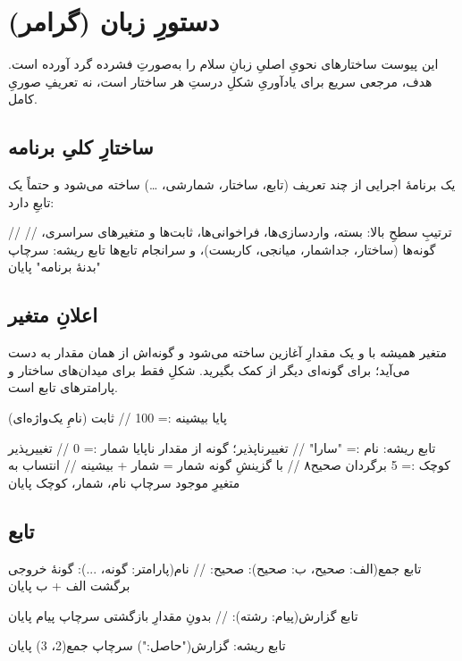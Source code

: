 \chapter{دستورِ زبان (گرامر)}%
\label{app:grammar}

این پیوست ساختارهای نحویِ اصلیِ زبانِ سلام را به‌صورتِ فشرده گرد آورده است. هدف،
مرجعی سریع برای یادآوریِ شکلِ درستِ هر ساختار است، نه تعریفِ صوریِ کامل.

\section{ساختارِ کلیِ برنامه}

یک برنامهٔ اجرایی از چند تعریف (تابع، ساختار، شمارشی، \ldots) ساخته می‌شود و
حتماً یک تابعِ  دارد:

\begin{salamfa}
// ترتیبِ سطحِ بالا: بسته، واردسازی‌ها، فراخوانی‌ها، ثابت‌ها و متغیرهای سراسری،
// گونه‌ها (ساختار، جداشمار، میانجی، کاربست)، و سرانجام تابع‌ها
تابع ریشه:
    سرچاپ "بدنهٔ برنامه"
پایان
\end{salamfa}

\section{اعلانِ متغیر}

متغیر همیشه با \code{:=} و یک مقدارِ آغازین ساخته می‌شود و گونه‌اش از همان مقدار
به دست می‌آید؛ برای گونه‌ای دیگر از  کمک بگیرید. شکلِ
 فقط برای میدان‌های ساختار و پارامترهای تابع است.

\begin{salamfa}
پایا بیشینه := 100                  // ثابت (نامِ یک‌واژه‌ای)

تابع ریشه:
    نام := "سارا"                   // تغییرناپذیر؛ گونه از مقدار
    ناپایا شمار := 0                 // تغییرپذیر
    کوچک := 5 برگردان صحیح۸          // با گزینشِ گونه
    شمار = شمار + بیشینه             // انتساب به متغیرِ موجود
    سرچاپ نام، شمار، کوچک
پایان
\end{salamfa}

\section{تابع}

\begin{salamfa}
تابع جمع(الف: صحیح، ب: صحیح): صحیح:  // نام(پارامتر: گونه، ...): گونهٔ خروجی
    برگشت الف + ب
پایان

تابع گزارش(پیام: رشته):              // بدونِ مقدارِ بازگشتی
    سرچاپ پیام
پایان

تابع ریشه:
    گزارش("حاصل:")
    سرچاپ جمع(2، 3)
پایان
\end{salamfa}

